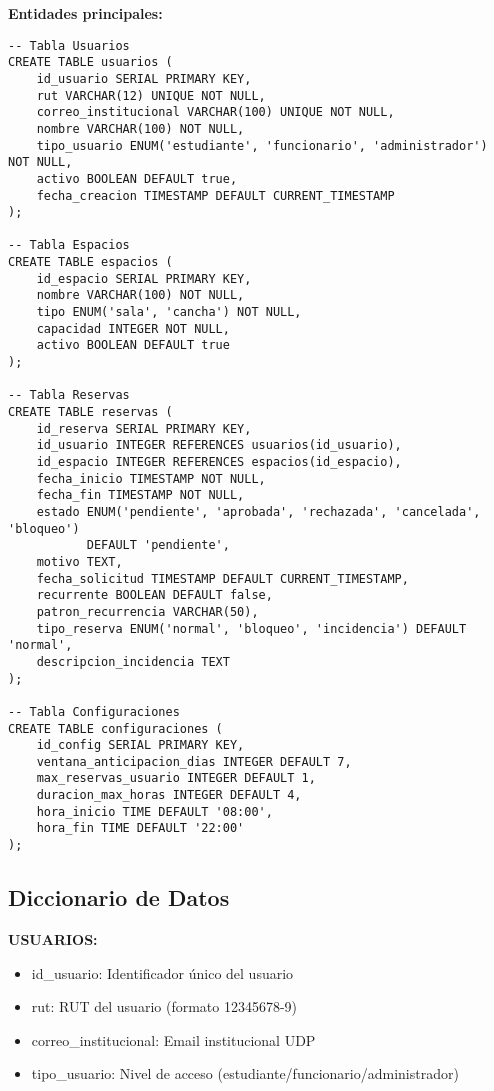 \documentclass[a4paper, titlepage, 12pt]{article}
\begin{document}
\textbf{Entidades principales:}

\begin{verbatim}
-- Tabla Usuarios
CREATE TABLE usuarios (
    id_usuario SERIAL PRIMARY KEY,
    rut VARCHAR(12) UNIQUE NOT NULL,
    correo_institucional VARCHAR(100) UNIQUE NOT NULL,
    nombre VARCHAR(100) NOT NULL,
    tipo_usuario ENUM('estudiante', 'funcionario', 'administrador') NOT NULL,
    activo BOOLEAN DEFAULT true,
    fecha_creacion TIMESTAMP DEFAULT CURRENT_TIMESTAMP
);

-- Tabla Espacios
CREATE TABLE espacios (
    id_espacio SERIAL PRIMARY KEY,
    nombre VARCHAR(100) NOT NULL,
    tipo ENUM('sala', 'cancha') NOT NULL,
    capacidad INTEGER NOT NULL,
    activo BOOLEAN DEFAULT true
);

-- Tabla Reservas
CREATE TABLE reservas (
    id_reserva SERIAL PRIMARY KEY,
    id_usuario INTEGER REFERENCES usuarios(id_usuario),
    id_espacio INTEGER REFERENCES espacios(id_espacio),
    fecha_inicio TIMESTAMP NOT NULL,
    fecha_fin TIMESTAMP NOT NULL,
    estado ENUM('pendiente', 'aprobada', 'rechazada', 'cancelada', 'bloqueo') 
           DEFAULT 'pendiente',
    motivo TEXT,
    fecha_solicitud TIMESTAMP DEFAULT CURRENT_TIMESTAMP,
    recurrente BOOLEAN DEFAULT false,
    patron_recurrencia VARCHAR(50),
    tipo_reserva ENUM('normal', 'bloqueo', 'incidencia') DEFAULT 'normal',
    descripcion_incidencia TEXT
);

-- Tabla Configuraciones
CREATE TABLE configuraciones (
    id_config SERIAL PRIMARY KEY,
    ventana_anticipacion_dias INTEGER DEFAULT 7,
    max_reservas_usuario INTEGER DEFAULT 1,
    duracion_max_horas INTEGER DEFAULT 4,
    hora_inicio TIME DEFAULT '08:00',
    hora_fin TIME DEFAULT '22:00'
);
\end{verbatim}

\subsection{Diccionario de Datos}

\textbf{USUARIOS:}
\begin{itemize}
    \item id\_usuario: Identificador único del usuario
    \item rut: RUT del usuario (formato 12345678-9)
    \item correo\_institucional: Email institucional UDP
    \item tipo\_usuario: Nivel de acceso (estudiante/funcionario/administrador)
\end{itemize}
\end{document}

